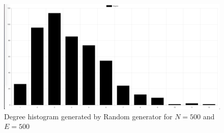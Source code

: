 \begin{figure}[h!]
    \includegraphics[width=\textwidth]{img/random500Histogram.jpg}
    \centering
    \caption{Degree histogram generated by Random generator for $N=500$ and $E=500$}
    \label{fig:random500histogram}
\end{figure} 